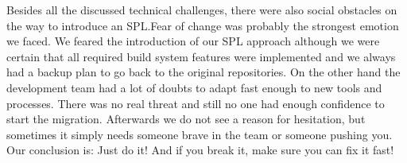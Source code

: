 Besides all the discussed technical challenges, there were also social obstacles
on the way to introduce an SPL.\@ Fear of change was probably the strongest
emotion we faced. We feared the introduction of our SPL approach although we
were certain that all required build system features were implemented and we
always had a backup plan to go back to the original repositories. On the other
hand the development team had a lot of doubts to adapt fast enough to new tools
and processes. There was no real threat and still no one had enough confidence
to start the migration. Afterwards we do not see a reason for hesitation, but
sometimes it simply needs someone brave in the team or someone pushing you. Our
conclusion is: Just do it! And if you break it, make sure you can fix it fast!
